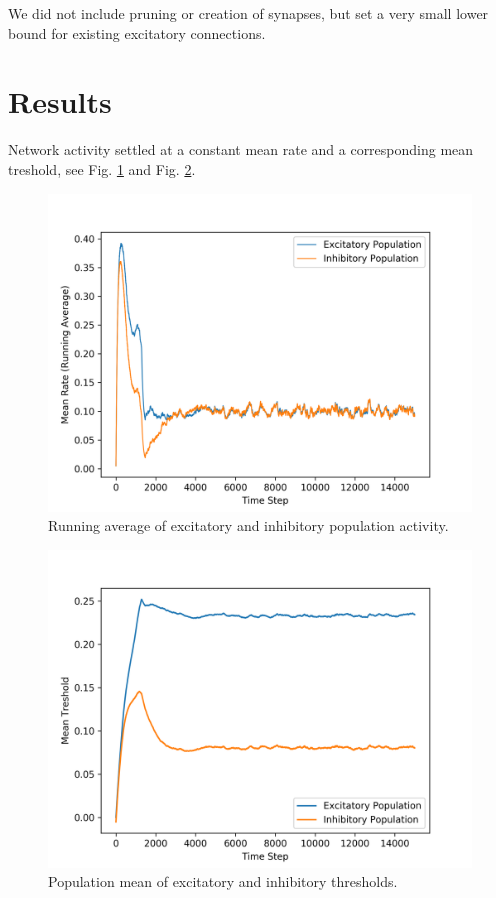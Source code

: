 \documentclass[10pt,a4paper]{article}
\begin{document}
We did not include pruning or creation of synapses, but set a very small lower bound for existing excitatory connections.

\section{Results}

Network activity settled at a constant mean rate and a corresponding mean treshold, see Fig. \ref{fig:pop_act_time} and Fig. \ref{fig:thresholds_time}. 

\begin{figure}
\includegraphics[width=\textwidth]{../../plots/pop_act_time.png}
\caption{\label{fig:pop_act_time} Running average of excitatory and inhibitory population activity.}
\end{figure}

\begin{figure}
\includegraphics[width=\textwidth]{../../plots/thresholds_time.png}
\caption{\label{fig:thresholds_time} Population mean of excitatory and inhibitory thresholds.}
\end{figure}
\end{document}

